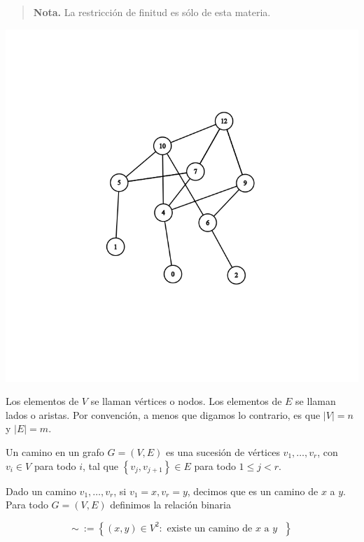 \documentclass[a4paper, 12pt]{article}
\begin{document}
\small
\begin{quote}

\textbf{Nota.} La restricción de finitud es sólo de esta materia. 

\end{quote}
\normalsize

\begin{center}
\includegraphics[scale=0.5]{graph}
\end{center}

Los elementos de $V$ se llaman vértices o nodos. Los elementos de $E$ se llaman
lados o aristas. Por convención, a menos que digamos lo contrario, es que $|V| =
n$ y $|E| = m$.

\begin{definition}
    Un camino en un grafo $G = (V, E) $ es una sucesión de vértices $v_1,
    \ldots, v_r$, con $ v_i \in V$ para todo $i$, tal que $\left\{ v_j, v_{j+1}
    \right\} \in E $ para todo $1 \leq j < r$. 
\end{definition}


Dado un camino $v_1, \ldots, v_r$, si $v_1 = x, v_r = y$, decimos que es un
camino de $x$ a $y$. Para todo $G = (V, E)$ definimos la relación binaria 

$$\sim ~:=\left\{ (x, y) \in V^2 : \text{ existe un camino de $x$ a $y$ }  \right\} $$
\end{document}
